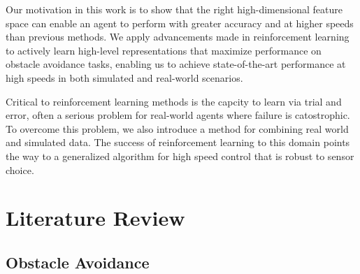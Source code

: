 \documentclass[paper=a4, fontsize=11pt]{scrartcl} %
\begin{document}
	Our motivation in this work is to show that the right high-dimensional feature space can enable an agent to perform with greater accuracy and at higher speeds than previous methods.
	We apply advancements made in reinforcement learning to actively learn high-level representations that maximize performance on obstacle avoidance tasks, enabling us to achieve state-of-the-art performance at high speeds in both simulated and real-world scenarios. 

	Critical to reinforcement learning methods is the capcity to learn via trial and error, often a serious problem for real-world agents where failure is catostrophic.
	To overcome this problem, we also introduce a method for combining real world and simulated data.
	The success of reinforcement learning to this domain points the way to a generalized algorithm for high speed control that is robust to sensor choice.

\section{Literature Review}

	\subsection{Obstacle Avoidance}
\end{document}
